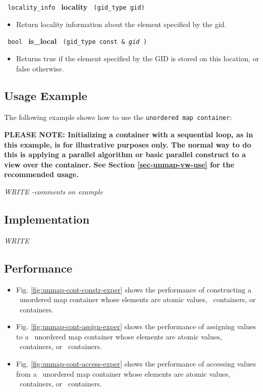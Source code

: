 \noindent
\texttt{%
locality\_info 
}
\textbf{locality}%
\texttt{%
 (gid\_type gid)
}

\begin{itemize}
\item
Return locality information about the element specified by the gid. 
\end{itemize}
 
\noindent
\texttt{%
bool
}
\textbf{is\_local}%
\texttt{%
(gid\_type const \&
\textit{gid}%
)
}

\begin{itemize}
\item
Returns true if the element specified by the GID is stored on this location, or false otherwise. 
\end{itemize}

\subsection{Usage Example} \label{sec-unmap-cont-use}

The following example shows how to use the \texttt{unordered map container}:


\textbf{PLEASE NOTE: 
Initializing a container with a sequential loop, as in this example,
is for illustrative purposes only.
The normal way to do this is applying a parallel algorithm or 
basic parallel construct to a view over the container.  See Section
\ref{sec-unmap-vw-use}
for the recommended usage.
}

\vspace{0.4cm} \textit{WRITE -comments on example}

\subsection{Implementation} \label{sec-unmap-cont-impl}

\textit{WRITE}

\subsection{Performance} \label{sec-unmap-cont-perf}

\begin{itemize}
\item
Fig. \ref{fig:unmap-cont-constr-exper}
shows the performance of constructing a \stapl\ unordered map container
whose elements are atomic values, \stl\ containers, or \stapl\ containers.
\item
Fig. \ref{fig:unmap-cont-assign-exper}
shows the performance of assigning values to a \stapl\ unordered map container
whose elements are atomic values, \stl\ containers, or \stapl\ containers.
\item
Fig. \ref{fig:unmap-cont-access-exper}
shows the performance of accessing values from a \stapl\ unordered map container
whose elements are atomic values, \stl\ containers, or \stapl\ containers.
\end{itemize}

